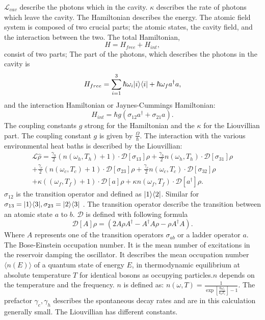 \documentclass[12pt,a4paper]{article}
\DeclarePairedDelimiter\bra{\langle}{\rvert}
\DeclarePairedDelimiter\ket{\lvert}{\rangle}
\begin{document}
$\mathcal{L}_{cav}$ describe the photons which in the cavity. $\kappa$ describes the rate of photons which leave the cavity.
The Hamiltonian describes the energy. 
The atomic field system is composed of two crucial 
parts; the atomic states, the cavity field, and the interaction between the two.
The total Hamiltonian,
\begin{equation}
H=H_{free}+H_{int},
\end{equation}
consist of two parts; The part of the photons, which describes the photons in the cavity is
\begin{equation}
H_{free}=\sum_{i=1}^3 \hbar \omega_i \ket{i}\bra{i}+\hbar \omega_f a^{\dag}a,\label{2}
\end{equation}
and the interaction Hamiltonian or Jaynes-Cummings Hamiltonian:
\begin{equation}
H_{int}=\hbar g(\sigma_{12}a^{\dag}+\sigma_{21}a).\label{3}
\end{equation}
The coupling constants $g$ strong for the Hamiltonian and the $\kappa$ for the Liouvillian part. 
The coupling constant $g$ is given by $\frac{\Omega}{\hbar}$.
\newpage
The interaction with the various environmental heat baths is described by the Liouvillian:
\begin{equation}
\begin{aligned}
\mathcal{L}\hat{\rho}=\frac{\gamma_h}{2}(n(\omega_h,T_h)+1)   \cdot \mathcal{D}[\sigma_{13}]\rho
+\frac{\gamma_h}{2}n(\omega_h,T_h)\cdot \mathcal{D}[\sigma_{31}]\rho \\
+\frac{\gamma_c}{2}(n(\omega_c,T_c)+1)\cdot \mathcal{D}[\sigma_{23}]\rho
+\frac{\gamma_c}{2}n(\omega_c,T_c) \cdot \mathcal{D}[\sigma_{32}]\rho \\
+\kappa((\omega_f,T_f)+1)	\cdot\mathcal{D}[a]\rho+
\kappa n(\omega_f,T_f)\cdot \mathcal{D}[a^{\dag}]\rho.
\end{aligned}
\end{equation}
$\sigma_{12} $ is the transition operator and defined as $ \ket{1}\bra{2}$. Similar for $\sigma_{13}=\ket{1}\bra{3}, \sigma_{23}=\ket{2}\bra{3}$ . The transition operator describe the transition between an atomic state $a$ to $b$. 
$\mathcal{D}$ is defined with following formula
\begin{equation}
\mathcal{D}[A]\rho=(2A \rho	A^{\dag}-A^{\dag}A\rho-\rho A^{\dag}A).
\end{equation}
Where $A$ represents one of the transition operators $\sigma_{ab}$ or a ladder operator $a$.
The Bose-Einstein occupation number. It is the mean number of excitations in the reservoir damping the oscillator. It describes the mean occupation number $\langle n(E) \rangle$ of a quantum state of energy $E$, in thermodynamic equilibrium at absolute temperature $T $ for identical bosons as occupying particles.$ n$ depends on the temperature and the frequency.
$n$ is defined as:
$
n(\omega,T)=\frac{1}{\exp[\frac{\hbar \omega_i}{k_b T_i}]-1}.
$
The  prefactor $\gamma_c ,\gamma_h$ describes the spontaneous decay rates and are in this calculation generally small.
The Liouvillian has different constants. 
\end{document}
